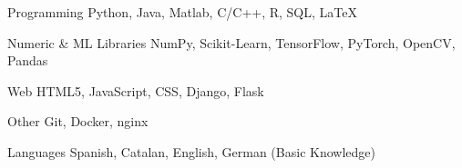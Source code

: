 
\begin{cvskills}

\cvskill
	{Programming}
	{Python, Java, Matlab, C/C++, R, SQL, \LaTeX}

\cvskill
	{Numeric \& ML Libraries}
	{NumPy, Scikit-Learn, TensorFlow, PyTorch, OpenCV, Pandas}

\cvskill
	{Web}
	{HTML5, JavaScript, CSS, Django, Flask}

\cvskill
	{Other}
	{Git, Docker, nginx}

\cvskill
	{Languages}
	{Spanish, Catalan, English, German (Basic Knowledge)}

\end{cvskills}
